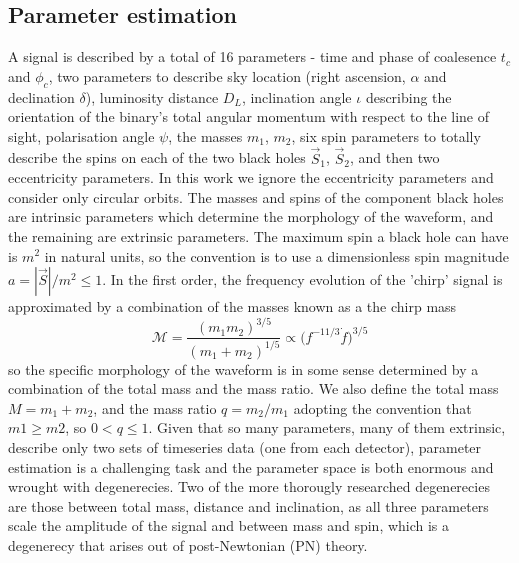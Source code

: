 \documentclass[]{article}
\begin{document}
\subsection{Parameter estimation}
A signal is described by a total of 16 parameters\cite{props} - time and phase of coalesence $t_c$ and $\phi_c$, two parameters to describe sky location (right ascension, $\alpha$ and declination $\delta$), luminosity distance $D_L$, inclination angle $\iota$ describing the orientation of the binary's total angular momentum with respect to the line of sight, polarisation angle $\psi$, the masses $m_1$, $m_2$, six spin parameters to totally describe the spins on each of the two black holes $\vec{S}_1$, $\vec{S}_2$, and then two eccentricity parameters. In this work we ignore the eccentricity parameters and consider only circular orbits. The masses and spins of the component black holes are intrinsic parameters which determine the morphology of the waveform, and the remaining are extrinsic parameters. The maximum spin a black hole can have is $m^2$ in natural units, so the convention is to use a dimensionless spin magnitude $a=|\vec{S}|/m^2 \leq 1$. In the first order, the frequency evolution of the 'chirp' signal is approximated by a combination of the masses known as a the chirp mass
\begin{equation}
\mathcal{M}=\frac{(m_1m_2)^{3/5}}{(m_1+m_2)^{1/5}}\propto \bigg(f^{-11/3}\dot{f}\bigg)^{3/5}
\end{equation}
so the specific morphology of the waveform is in some sense determined by a combination of the total mass and the mass ratio. We also define the total mass $M=m_1+m_2$, and the mass ratio $q=m_2/m_1$ adopting the convention that $m1\geq m2$, so $0<q\leq1$.
Given that so many parameters, many of them extrinsic, describe only two sets of timeseries data (one from each detector), parameter estimation is a challenging task and the parameter space is both enormous and wrought with degenerecies. Two of the more thorougly researched degenerecies are those between total mass, distance and inclination, as all three parameters scale the amplitude of the signal and between mass and spin\cite{spindegen}, which is a degenerecy that arises out of post-Newtonian (PN) theory. 
\end{document}

